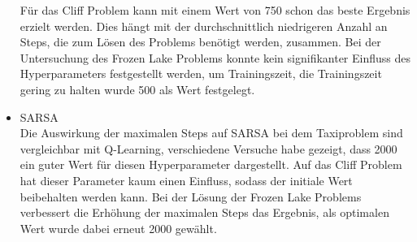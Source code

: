 \begin{itemize}
    Für das Cliff Problem kann mit einem Wert von 750 schon das beste Ergebnis erzielt werden. 
    Dies hängt mit der durchschnittlich niedrigeren Anzahl an Steps, die zum Lösen des Problems benötigt werden, zusammen. 
    Bei der Untersuchung des Frozen Lake Problems konnte kein signifikanter Einfluss des Hyperparameters festgestellt werden, um Trainingszeit, die Trainingszeit gering zu halten wurde 500 als Wert festgelegt.
    \item SARSA\\
    Die Auswirkung der maximalen Steps auf SARSA bei dem Taxiproblem sind vergleichbar mit Q-Learning, verschiedene Versuche habe gezeigt, dass 2000 ein guter Wert für diesen Hyperparameter dargestellt.
Auf das Cliff Problem hat dieser Parameter kaum einen Einfluss, sodass der initiale Wert beibehalten werden kann.
Bei der Lösung der Frozen Lake Problems verbessert die Erhöhung der maximalen Steps das Ergebnis, als optimalen Wert wurde dabei erneut 2000 gewählt.
\end{itemize}
